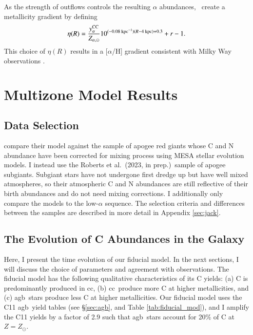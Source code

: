 \documentclass[12pt,oneside,letterpaper]{report}
\newcommand{\cc}{\gls{cc}}
\newcommand{\agb}{\gls{agb}}
\newcommand{\apogee}{\gls{apogee}}
\newcommand{\JJ}{\citetalias{james+21}}
\newcommand{\citetjack}{Roberts et al.~(2023, in prep.)}
\begin{document}
As the strength of outflows controls the resulting $\alpha$ abundances, \JJ~create a metallicity gradient by defining
\begin{equation}
\eta(R) = \frac{y_{\alpha}^{\rm CC}}{Z_{\alpha, \odot}} 10^{(-0.08\text{ kpc}^{-1})(R-4\text{ kpc})+0.3} + r - 1.
\end{equation}
This choice of $\eta(R)$ results in a [$\alpha$/H] gradient consistent with Milky Way observations \citep[e.g.][]{hayden+14, weinberg+19, frinchaboy+13}.


\chapter{Multizone Model Results}
\section{Data Selection}

\citet{james+23} compare their model against the \cite{vincenzo+21} sample of \apogee{} \citep{apogee17} red giants whose C and N abundance have been corrected for mixing process using MESA stellar evolution models. 
I instead use the \citetjack~sample of \apogee{} subgiants. Subgiant stars have not undergone first dredge up but have well mixed atmospheres, so their atmospheric C and N abundances are still reflective of their birth abundances and do not need mixing corrections. I additionally only compare the models to the low-$\alpha$ sequence.  The selection criteria and differences between the samples are described in more detail in Appendix \ref{sec:jack}.



\section{The Evolution of C Abundances in the Galaxy}

Here, I present the time evolution of our fiducial model. In the next sections, I will discuss the choice of parameters and agreement with observations. 
The fiducial model has the following qualitative characteristics of its C yields: (a) C is predominantly produced in \cc, (b) \cc\ produce more C at higher metallicities, and (c) \agb\ stars produce less C at higher metallicities. Our fiducial model uses the C11 \agb\ yield tables (see \S\ref{sec:agb}, and Table \ref{tab:fiducial_mod}), and I amplify the C11 yields by a factor of 2.9 such that \agb\ stars account for 20\% of C at $Z=Z_\odot$. 
\end{document}
